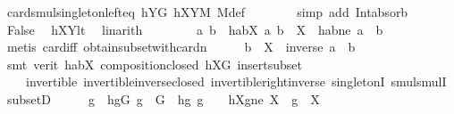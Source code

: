 \begin{isabellebody}
\ card{\isacharunderscore}{\kern0pt}smul{\isacharunderscore}{\kern0pt}singleton{\isacharunderscore}{\kern0pt}left{\isacharunderscore}{\kern0pt}eq\ hYG\ hXYM\ M{\isacharunderscore}{\kern0pt}def\isanewline
\ \ \ \ \ \ \isamarkupfalse%
\ {\isacharparenleft}{\kern0pt}simp\ add{\isacharcolon}{\kern0pt}\ Int{\isacharunderscore}{\kern0pt}absorb{}{\isacharparenright}{\kern0pt}\isanewline
\ \ \ \ \isamarkupfalse%
\ \isamarkupfalse%
\ False\ \isamarkupfalse%
\ hXYlt\ \isamarkupfalse%
\ linarith\isanewline
\ \ \isamarkupfalse%
\isanewline
\ \ \isamarkupfalse%
\ \isamarkupfalse%
\ a\ b\ \ habX{\isacharcolon}{\kern0pt}\ {\isachardoublequoteopen}{\isacharbraceleft}{\kern0pt}a{\isacharcomma}{\kern0pt}\ b{\isacharbraceright}{\kern0pt}\ {\isasymsubseteq}\ X{\isachardoublequoteclose}\ \ habne{\isacharcolon}{\kern0pt}\ {\isachardoublequoteopen}a\ {\isasymnoteq}\ b{\isachardoublequoteclose}\ \isamarkupfalse%
\ {\isacharparenleft}{\kern0pt}metis\ card{\isacharunderscore}{\kern0pt}{}{\isacharunderscore}{\kern0pt}iff\ obtain{\isacharunderscore}{\kern0pt}subset{\isacharunderscore}{\kern0pt}with{\isacharunderscore}{\kern0pt}card{\isacharunderscore}{\kern0pt}n{\isacharparenright}{\kern0pt}\isanewline
\ \ \isamarkupfalse%
\ \isamarkupfalse%
\ {\isachardoublequoteopen}b\ {\isasymin}\ X\ {\isasymcdots}\ {\isacharbraceleft}{\kern0pt}inverse\ a\ {\isasymcdot}\ b{\isacharbraceright}{\kern0pt}{\isachardoublequoteclose}\ \isamarkupfalse%
\ {\isacharparenleft}{\kern0pt}smt\ {\isacharparenleft}{\kern0pt}verit{\isacharparenright}{\kern0pt}\ habX\ composition{\isacharunderscore}{\kern0pt}closed\ hXG\ insert{\isacharunderscore}{\kern0pt}subset\ \isanewline
\ \ \ \ invertible\ invertible{\isacharunderscore}{\kern0pt}inverse{\isacharunderscore}{\kern0pt}closed\ invertible{\isacharunderscore}{\kern0pt}right{\isacharunderscore}{\kern0pt}inverse{}\ singletonI\ smul{\isachardot}{\kern0pt}smulI\ subsetD{\isacharparenright}{\kern0pt}\isanewline
\ \ \isamarkupfalse%
\ \isamarkupfalse%
\ g\ \ hgG{\isacharcolon}{\kern0pt}\ {\isachardoublequoteopen}g\ {\isasymin}\ G{\isachardoublequoteclose}\ \ hg{}{\isacharcolon}{\kern0pt}\ {\isachardoublequoteopen}g\ {\isasymnoteq}\ {\isasymone}{\isachardoublequoteclose}\ \ hXgne{\isacharcolon}{\kern0pt}\ {\isachardoublequoteopen}{\isacharparenleft}{\kern0pt}X\ {\isasymcdots}\ {\isacharbraceleft}{\kern0pt}g{\isacharbraceright}{\kern0pt}{\isacharparenright}{\kern0pt}\ {\isasyminter}\ X\ {\isasymnoteq}\ {\isacharbraceleft}{\kern0pt}{\isacharbraceright}{\kern0pt}{\isachardoublequoteclose}\ \isanewline

\end{isabellebody}

